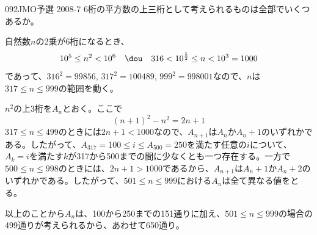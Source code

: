 \begin{prob}{092}{}{JMO予選 2008-7}
 6桁の平方数の上三桁として考えられるものは全部でいくつあるか。 \hfil
\end{prob}
自然数$n$の2乗が6桁になるとき、
\[ 10^5\le n^2 < 10^6 \quad \dou\quad 316<10^{\frac{5}{2}}\le n < 10^3=1000 \]
であって、$316^2=99856$, $317^2=100489$, $999^2=998001$なので、$n$は$317\le n\le 999$の範囲を動く。

$n^2$の上3桁を$A_n$とおく。ここで
\[ (n+1)^2-n^2=2n+1 \]
$317\le n\le 499$のときには$2n+1<1000$なので、$A_{n+1}$は$A_n$か$A_n+1$のいずれかである。したがって、$A_{317}=100\le i\le A_{500}=250$を満たす任意の$i$について、$A_k=i$を満たす$k$が317から500までの間に少なくとも一つ存在する。一方で$500\le n\le 998$のときには、$2n+1>1000$であるから、$A_{n+1}$は$A_n+1$か$A_n+2$のいずれかである。したがって、$501\le n \le 999$における$A_n$は全て異なる値をとる。

以上のことから$A_n$は、100から250までの151通りに加え、$501\le n\le 999$の場合の499通りが考えられるから、あわせて650通り。